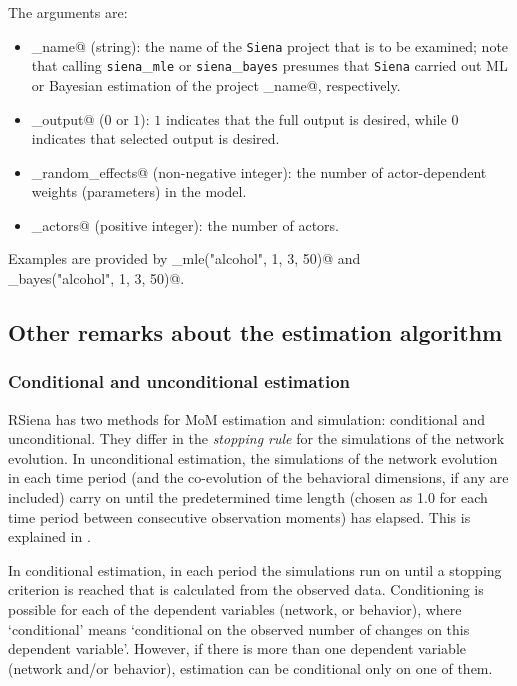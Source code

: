 \documentclass[a4paper,fleqn,11pt]{article}
\newcommand{\+}{\, + \,}
\newcommand{\RS}{{\sf \textsf{RSiena} }}
\begin{document}
The arguments are:
\begin{itemize}
\item[---] \verb@project_name@ (string): the name of the {\tt Siena} project
that is to be examined;
note that calling {\tt siena}\_{\tt mle} or {\tt siena}\_{\tt bayes} presumes
that {\tt Siena} carried out ML or Bayesian estimation of the
project \verb@project_name@, respectively.
\item[---] \verb@full_output@ ($0$ or $1$): $1$ indicates that the full output is desired,
while $0$ indicates that selected output is desired.
\item[---] \verb@no_random_effects@ (non-negative integer): the number of
actor-dependent weights (parameters) in the model.
\item[---] \verb@no_actors@ (positive integer): the number of actors.
\end{itemize}
Examples are provided by \verb@siena_mle("alcohol", 1, 3, 50)@ and\\
\verb@siena_bayes("alcohol", 1, 3, 50)@.

\fi

\subsection{Other remarks about the estimation algorithm}

\subsubsection{Conditional and unconditional estimation}
\label{S_cond}

\RS has two methods for MoM estimation and simulation:
\hypertarget{T_S_cond}{conditional and unconditional}. They differ
in the {\em stopping rule} for the simulations of the network
evolution. In unconditional estimation, the simulations of the
network evolution in each time period (and the co-evolution of the
behavioral dimensions, if any are included) carry on until the
predetermined time length (chosen as 1.0
for each time period between consecutive observation moments) has elapsed.
This is explained in \citet[][Section 4.2]{Snijders01}.

In conditional estimation, in each period
the simulations run on until a stopping
criterion is reached that is calculated from the observed data.
Conditioning is possible for each of the dependent variables
(network, or behavior), where `conditional' means `conditional on
the observed number of changes on this dependent variable'.
However, if there is more than one dependent variable
(network and/or behavior), estimation can be conditional only
on one of them.
\end{document}

